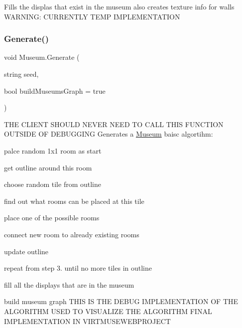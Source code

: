 Fills the displas that exist in the museum also creates texture info for walls W\+A\+R\+N\+I\+NG\+: C\+U\+R\+R\+E\+N\+T\+LY T\+E\+MP I\+M\+P\+L\+E\+M\+E\+N\+T\+A\+T\+I\+ON 

\mbox{\label{class_museum_a2a301b4e27f35da164ffa03b3d3d7e81}} 
\subsubsection{\texorpdfstring{Generate()}{Generate()}}
{\footnotesize\ttfamily void Museum.\+Generate (\begin{DoxyParamCaption}\item[{string}]{seed,  }\item[{bool}]{build\+Museums\+Graph = {\ttfamily true} }\end{DoxyParamCaption})}



T\+HE C\+L\+I\+E\+NT S\+H\+O\+U\+LD N\+E\+V\+ER N\+E\+ED TO C\+A\+LL T\+H\+IS F\+U\+N\+C\+T\+I\+ON O\+U\+T\+S\+I\+DE OF D\+E\+B\+U\+G\+G\+I\+NG Generates a \mbox{\hyperlink{class_museum}{Museum}} baisc algortihm\+: 


\begin{DoxyEnumerate}
\item palce random 1x1 room as start
\item get outline around this room
\item choose random tile from outline
\item find out what rooms can be placed at this tile
\item place one of the possible rooms
\item connect new room to already existing rooms
\item update outline
\item repeat from step 3. until no more tiles in outline
\item fill all the displays that are in the museum
\item build museum graph T\+H\+IS IS T\+HE D\+E\+B\+UG I\+M\+P\+L\+E\+M\+E\+N\+T\+A\+T\+I\+ON OF T\+HE A\+L\+G\+O\+R\+I\+T\+HM U\+S\+ED TO V\+I\+S\+U\+A\+L\+I\+ZE T\+HE A\+L\+G\+O\+R\+I\+T\+HM F\+I\+N\+AL I\+M\+P\+L\+E\+M\+E\+N\+T\+A\+T\+I\+ON IN V\+I\+R\+T\+M\+U\+S\+E\+W\+E\+B\+P\+R\+O\+J\+E\+CT 
\end{DoxyEnumerate}


